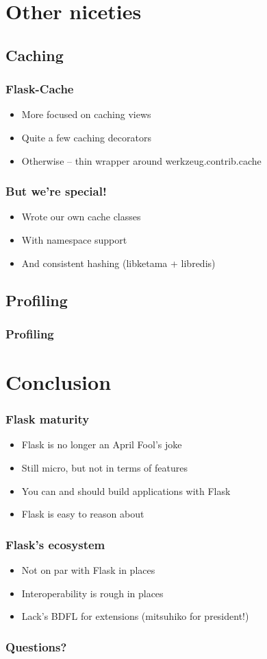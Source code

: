 \documentclass{beamer}
\begin{document}
\section{Other niceties}

\subsection{Caching}

\begin{frame}
  \frametitle{Flask-Cache}
  \begin{itemize}
  \item More focused on caching views
  \item Quite a few caching decorators
  \item Otherwise -- thin wrapper around werkzeug.contrib.cache
  \end{itemize}
\end{frame}

\begin{frame}
  \frametitle{But we're special!}
  \begin{itemize}
  \item Wrote our own cache classes
  \item With namespace support
  \item And consistent hashing (libketama + libredis)
  \end{itemize}
\end{frame}

\subsection{Profiling}

\begin{frame}
  \frametitle{Profiling}
\end{frame}

\section*{Conclusion}

\begin{frame}
  \frametitle{Flask maturity}
  \begin{itemize}
  \item Flask is no longer an April Fool's joke
  \item Still micro, but not in terms of features
  \item You can and should build applications with Flask
  \item Flask is easy to reason about
  \end{itemize}
\end{frame}

\begin{frame}
  \frametitle{Flask's ecosystem}
  \begin{itemize}
  \item Not on par with Flask in places
  \item Interoperability is rough in places
  \item Lack's BDFL for extensions (mitsuhiko for president!)
  \end{itemize}
\end{frame}

\begin{frame}
  \frametitle{Questions?}
\end{frame}
\end{document}
